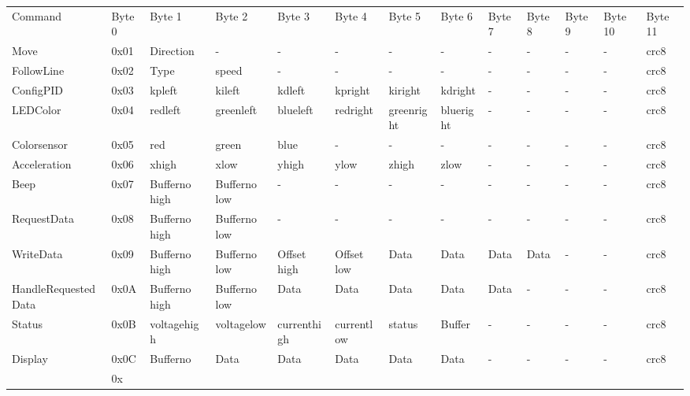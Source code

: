 \begin{landscape}
\begin{footnotesize}
\begin{tabular}{lllllllllllll}
Command &
    Byte 0 &
    Byte 1 &
    Byte 2 &
    Byte 3 &
    Byte 4 &
    Byte 5 &
    Byte 6 &
    Byte 7 &
    Byte 8 &
    Byte 9 &
    Byte 10 &
    Byte 11 \\
Move &
    0x01 &
    Direction &
    - &
    - &
    - &
    - &
    - &
    - &
    - &
    - &
    - &
    crc8 \\
FollowLine &
    0x02 &
    Type &
    speed &
    - &
    - &
    - &
    - &
    - &
    - &
    - &
    - &
    crc8 \\
ConfigPID &
    0x03 &
    kpleft &
    kileft &
    kdleft &
    kpright &
    kiright &
    kdright &
    - &
    - &
    - &
    - &
    crc8 \\
LEDColor &
    0x04 &
    redleft &
    greenleft &
    blueleft &
    redright &
    greenright &
    blueright &
    - &
    - &
    - &
    - &
    crc8 \\
Colorsensor &
    0x05 &
    red &
    green &
    blue &
    - &
    - &
    - &
    - &
    - &
    - &
    - &
    crc8 \\
Acceleration &
    0x06 &
    xhigh &
    xlow &
    yhigh &
    ylow &
    zhigh &
    zlow &
    - &
    - &
    - &
    - &
    crc8 \\
Beep &
    0x07 &
    Bufferno high &
    Bufferno low &
    - &
    - &
    - &
    - &
    - &
    - &
    - &
    - &
    crc8 \\
RequestData &
    0x08 &
    Bufferno high &
    Bufferno low &
    - &
    - &
    - &
    - &
    - &
    - &
    - &
    - &
    crc8 \\
WriteData &
    0x09 &
    Bufferno high &
    Bufferno low &
    Offset high &
    Offset low &
    Data &
    Data &
    Data &
    Data &
    - &
    - &
    crc8 \\
HandleRequestedData &
    0x0A &
    Bufferno high &
    Bufferno low &
    Data &
    Data &
    Data &
    Data &
    Data &
    - &
    - &
    - &
    crc8 \\
Status &
    0x0B &
    voltagehigh &
    voltagelow &
    currenthigh &
    currentlow &
    status &
    Buffer &
    - &
    - &
    - &
    - &
    crc8 \\
Display &
    0x0C &
    Bufferno &
    Data &
    Data &
    Data &
    Data &
    Data &
    - &
    - &
    - &
    - &
    crc8 \\
 &
    0x &

\end{tabular}
\end{footnotesize}
\end{landscape}
